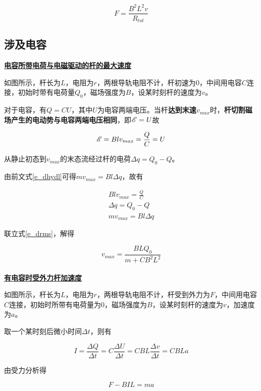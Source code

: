 \begin{equation}
\boxed{F = \frac{B^2 L^2 v}{R_{tot}}}
\end{equation}

\subsection{涉及电容}

\noindent \uline{\textbf{电容所带电荷与电磁驱动的杆的最大速度}}


如图所示，杆长为$L$，电阻为$r$，两根导轨电阻不计，杆初速为$0$，中间用电容$C$连接，初始时带有电荷量$Q_0$，磁场强度为$B$，设某时刻杆的速度为$v$。

对于电容，有$Q = C U$，其中$U$为电容两端电压。当杆\textbf{达到末速}$v_{max}$时，\textbf{杆切割磁场产生的电动势与电容两端电压相同}，即$\mathscr{E} = U$故

$$\mathscr{E} = B l v_{max} = \frac{Q}{C} = U$$

从静止初态到$v_{max}$的末态流经过杆的电荷$\Delta q = Q_0 - Q$。

由前文式\eqref{e_dhydl}可得$m v_{max} = B l \Delta q$，故有


\begin{equation}
\begin{aligned}
B l v_{max} = \frac{Q}{C} \\
\Delta q = Q_0 - Q \\
m v_{max} = B l \Delta q
\end{aligned}
\label{e_drms}
\end{equation}

联立式\eqref{e_drms}，解得

\begin{equation}
\boxed{v_{max} = \frac{B L Q_0}{m + C B^2 L^2}}
\end{equation}
~\\

\noindent \uline{\textbf{有电容时受外力杆加速度}}


如图所示，杆长为$L$，电阻为$r$，两根导轨电阻不计，杆受到外力为$F$，中间用电容$C$连接，初始时所带有电荷量为$0$，磁场强度为$B$，设某时刻杆的速度为$v$，加速度为$a$。

取一个某时刻后微小时间$\Delta t$，则有

$$I = \frac{\Delta Q}{\Delta t} = C \frac{\Delta U}{\Delta t} = CBL \frac{\Delta v}{\Delta t} = CBLa$$

由受力分析得

$$F - BIL = ma$$

